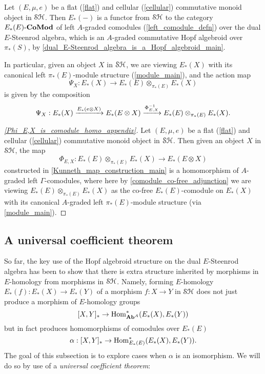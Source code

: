\documentclass[../main.tex]{subfiles}
\begin{document}
\begin{proposition}\label{E_*_functor_from_SH_to_E*E-comodules_main}
    Let $(E,\mu,e)$ be a flat (\autoref{flat}) and cellular (\autoref{cellular}) commutative monoid object in $\mathcal{SH}$. Then $E_*(-)$ is a functor from $\mathcal{SH}$ to the category $E_*(E)\text-\mathbf{CoMod}$ of left $A$-graded comodules (\autoref{left_comodule_defn}) over the dual $E$-Steenrod algebra, which is an $A$-graded commutative Hopf algebroid over $\pi_*(S)$, by \autoref{dual_E-Steenrod_algebra_is_a_Hopf_algebroid_main}.

    In particular, given an object $X$ in $\mathcal{SH}$, we are viewing $E_*(X)$ with its canonical left $\pi_*(E)$-module structure (\autoref{module_main}), and the action map 
    \[\Psi_X:E_*(X)\to E_*(E)\otimes_{\pi_*(E)}E_*(X)\]
    is given by the composition
    \[\Psi_X:E_*(X)\xrightarrow{E_*(e\otimes X)}E_*(E\otimes X)\xrightarrow{\Phi_{E,X}^{-1}}E_*(E)\otimes_{\pi_*(E)}E_*(X).\]
\end{proposition}

\begin{proof}[\autoref{Phi_E,X_is_comodule_homo_appendix}]\label{Phi_E,X_is_comodule_homo_main}
    Let $(E,\mu,e)$ be a flat (\autoref{flat}) and cellular (\autoref{cellular}) commutative monoid object in $\mathcal{SH}$. Then given an object $X$ in $\mathcal{SH}$, the map
    \[\Phi_{E,X}:E_*(E)\otimes_{\pi_*(E)}E_*(X)\to E_*(E\otimes X)\]
    constructed in \autoref{Kunneth_map_construction_main} is a homomorphism of $A$-graded left $\Gamma$-comodules, where here by \autoref{comodule_co-free_adjunction} we are viewing $E_*(E)\otimes_{\pi_*(E)}E_*(X)$ as the co-free $E_*(E)$-comodule on $E_*(X)$ with its canonical $A$-graded left $\pi_*(E)$-module structure (via \autoref{module_main}).
\end{proof}

\subsection{A universal coefficient theorem}\label{subsection:UCT}

So far, the key use of the Hopf algebroid structure on the dual $E$-Steenrod algebra has been to show that there is extra structure inherited by morphisms in $E$-homology from morphisms in $\mathcal{SH}$. Namely, forming $E$-homology $E_*(f):E_*(X)\to E_*(Y)$ of a morphism $f:X\to Y$ in $\mathcal{SH}$ does not just produce a morphism of $E$-homology groups
\[[X,Y]_*\to\mathrm{Hom}_{\mathbf{Ab}^A}^*(E_*(X),E_*(Y))\]
but in fact produces homomorphisms of comodules over $E_*(E)$
\[\alpha:[X,Y]_*\to\mathrm{Hom}_{E_*(E)}^*(E_*(X),E_*(Y)).\]
The goal of this subsection is to explore cases when $\alpha$ is an isomorphism. We will do so by use of a \emph{universal coefficient theorem}:
\end{document}
